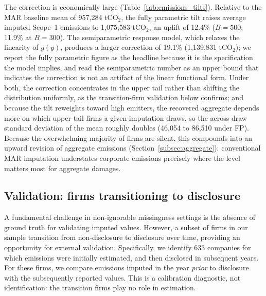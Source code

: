 \documentclass[a4paper,12pt]{article}
\newcommand{\citep}[1]{\parencite{#1}}
\begin{document}

The correction is economically large (Table~\ref{tab:emissions_tilts}). Relative to the MAR baseline mean of 957{,}284 tCO$_2$, the fully parametric tilt raises average imputed Scope~1 emissions to 1{,}075{,}583 tCO$_2$, an uplift of 12.4\% ($B=500$; 11.9\% at $B=300$). The semiparametric response model, which relaxes the linearity of $g(y)$, produces a larger correction of 19.1\% (1{,}139{,}831 tCO$_2$); we report the fully parametric figure as the headline because it is the specification the model implies, and read the semiparametric number as an upper bound that indicates the correction is not an artifact of the linear functional form. Under both, the correction concentrates in the upper tail rather than shifting the distribution uniformly, as the transition-firm validation below confirms; and because the tilt reweights toward high emitters, the recovered aggregate depends more on which upper-tail firms a given imputation draws, so the across-draw standard deviation of the mean roughly doubles (46{,}054 to 86{,}510 under FP). Because the overwhelming majority of firms are silent, this compounds into an upward revision of aggregate emissions (Section~\ref{subsec:aggregate}): conventional MAR imputation understates corporate emissions precisely where the level matters most for aggregate damages.

\subsection{Validation: firms transitioning to disclosure}
\label{subsec:validation}

A fundamental challenge in non-ignorable missingness settings is the absence of ground truth for validating imputed values. However, a subset of firms in our sample transition from non-disclosure to disclosure over time, providing an opportunity for external validation. Specifically, we identify 633 companies for which emissions were initially estimated, and then disclosed in subsequent years. For these firms, we compare emissions imputed in the year \textit{prior} to disclosure with the subsequently reported values. This is a calibration diagnostic, not identification: the transition firms play no role in estimation. 
\end{document}
